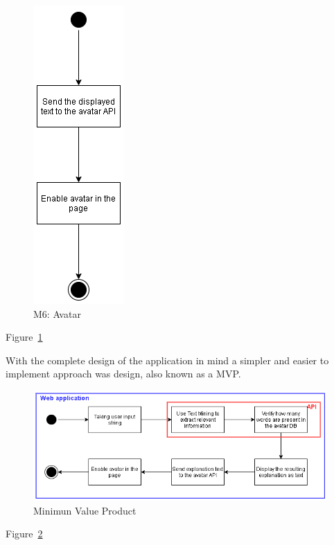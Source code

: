 \begin{figure}[H]
\centering
\includegraphics[scale=0.5]{ch4/assets/M6.png}
\caption[Avatar Module]{M6: Avatar}
\label{fig:M6}
\end{figure}

Figure~\ref{fig:M6}


With the complete design of the application in mind a simpler and easier to implement approach was design, also known as a \gls{MVP}.

\begin{figure}[H]
\centering
\includegraphics[width=\textwidth,keepaspectratio]{ch4/assets/mvp_2.png}
\caption[Minimun Value Product]{Minimun Value Product}
\label{fig:mvp}
\end{figure}

Figure~\ref{fig:mvp}